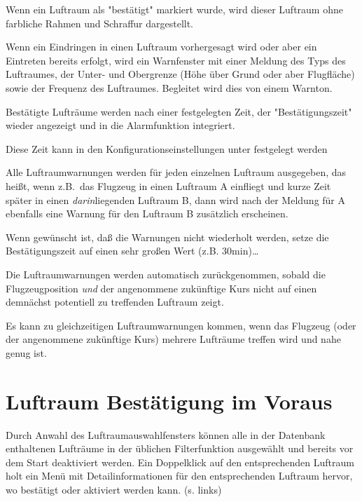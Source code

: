 Wenn ein Luftraum als "bestätigt" markiert wurde, wird dieser Luftraum
ohne farbliche Rahmen und Schraffur dargestellt.

Wenn ein Eindringen in einen Luftraum vorhergesagt wird oder aber ein
Eintreten bereits erfolgt, wird ein Warnfenster mit einer Meldung des Typs
des Luftraumes, der Unter- und Obergrenze (Höhe über Grund oder aber
Flugfläche) sowie der Frequenz des Luftraumes.
Begleitet wird dies von einem Warnton.

Bestätigte Lufträume werden nach einer festgelegten Zeit, der "Bestätigungszeit"
wieder angezeigt und in die Alarmfunktion integriert. 

Diese Zeit kann in den Konfigurationseinstellungen unter  festgelegt werden

Alle Luftraumwarnungen werden für jeden einzelnen Luftraum ausgegeben, das heißt,
 wenn z.B.\ das Flugzeug in einen Luftraum \textsf{A} einfliegt und kurze
Zeit später in einen \textsl{darin}liegenden Luftraum \textsf{B}, dann wird
nach der Meldung für \textsf{A} ebenfalls eine Warnung für den Luftraum
\textsf{B} zusätzlich erscheinen.

\tip Wenn gewünscht ist, daß die Warnungen nicht wiederholt werden, setze die
 Bestätigungszeit auf einen sehr großen Wert (z.B. 30min)\dots

Die Luftraumwarnungen werden automatisch zurückgenommen, sobald die
Flugzeugposition \emph{und}  der angenommene zukünftige Kurs nicht auf einen
demnächst potentiell zu treffenden Luftraum zeigt.

Es kann zu gleichzeitigen  Luftraumwarnungen kommen, wenn  das Flugzeug
(oder der angenommene zukünftige Kurs) mehrere Lufträume treffen wird und nahe
genug ist.

\section{Luftraum Bestätigung im Voraus}\label{sec:air-ack}

Durch Anwahl des Luftraumauswahlfensters können alle in der Datenbank enthaltenen Lufträume in der üblichen  Filterfunktion  ausgewählt und bereits vor dem Start deaktiviert  werden.  Ein Doppelklick auf den entsprechenden Luftraum holt ein Menü mit Detailinformationen für den entsprechenden Luftraum hervor, wo bestätigt oder aktiviert werden kann.  (s. links) 

